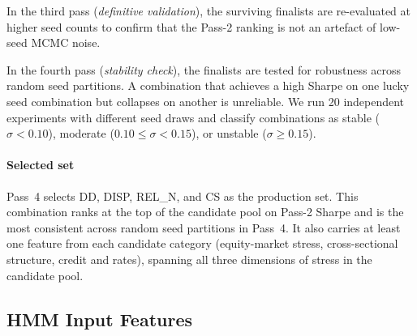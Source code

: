 In the third pass (\emph{definitive validation}), the surviving finalists are re-evaluated at higher seed counts to confirm that the Pass-2 ranking is not an artefact of low-seed MCMC noise.

In the fourth pass (\emph{stability check}), the finalists are tested for robustness across random seed partitions. A combination that achieves a high Sharpe on one lucky seed combination but collapses on another is unreliable. We run 20 independent experiments with different seed draws and classify combinations as stable ($\sigma < 0.10$), moderate ($0.10 \leq \sigma < 0.15$), or unstable ($\sigma \geq 0.15$).

\paragraph{Selected set}
Pass~4 selects DD, DISP, REL\_N, and CS as the production set. This combination ranks at the top of the candidate pool on Pass-2 Sharpe and is the most consistent across random seed partitions in Pass~4. It also carries at least one feature from each candidate category (equity-market stress, cross-sectional structure, credit and rates), spanning all three dimensions of stress in the candidate pool.

\subsection{HMM Input Features}\label{sec:hmm_features}

